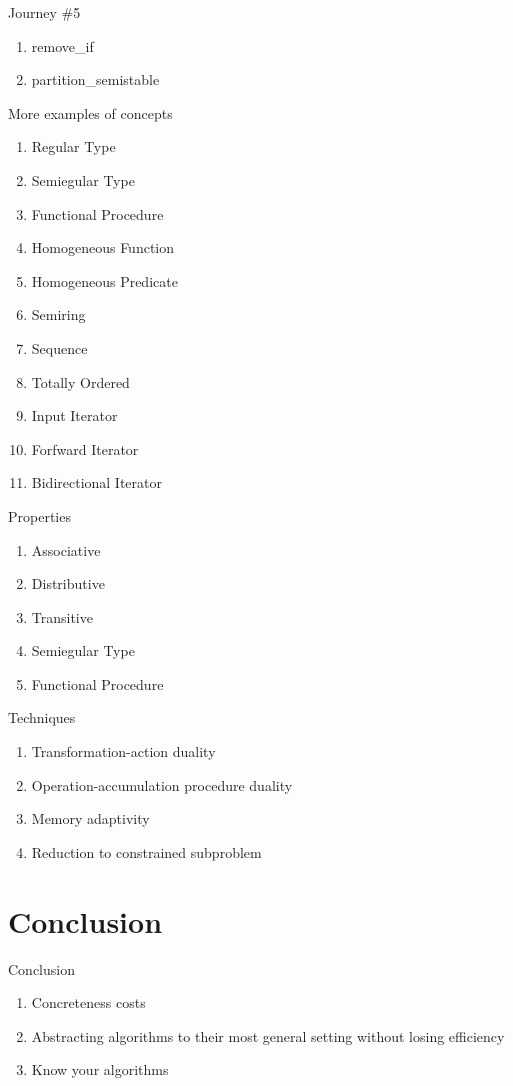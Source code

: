 \documentclass[10pt]{beamer}
\begin{document}
\begin{frame}{Journey \#5}
    \begin{enumerate}
        \item remove\_if
        \item partition\_semistable
    \end{enumerate}
\end{frame}


\begin{frame}{More examples of concepts}
\begin{enumerate}
  \item Regular Type
  \item Semiegular Type
  \item Functional Procedure
  \item Homogeneous Function
  \item Homogeneous Predicate
  \item Semiring
  \item Sequence
  \item Totally Ordered
  \item Input Iterator
  \item Forfward Iterator
  \item Bidirectional Iterator
\end{enumerate}
\end{frame}

\begin{frame}{Properties}
\begin{enumerate}
  \item Associative
  \item Distributive
  \item Transitive
  \item Semiegular Type
  \item Functional Procedure
\end{enumerate}
\end{frame}

\begin{frame}{Techniques}
\begin{enumerate}
  \item Transformation-action duality
  \item Operation-accumulation procedure duality
  \item Memory adaptivity
  \item Reduction to constrained subproblem 
\end{enumerate}
\end{frame}

\section{Conclusion}

\begin{frame}{Conclusion}
  \begin{enumerate}
    \item Concreteness costs
    \item Abstracting algorithms to their most general setting without losing efficiency
    \item Know your algorithms
  \end{enumerate}
\end{frame}
\end{document}
